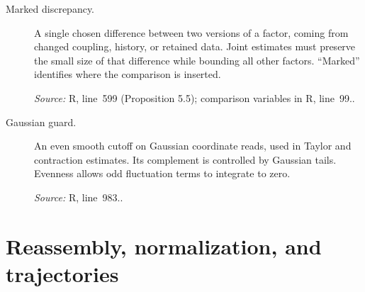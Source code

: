 \documentclass[11pt]{article}
\newcommand{\src}[2]{\textsf{#1}, line~#2}
\newcommand{\where}[1]{\par{\small\textit{Source:} #1.}}
\begin{document}
\begin{description}
\item[Marked discrepancy.]
A single chosen difference between two versions of a factor, coming
from changed coupling, history, or retained data.  Joint estimates
must preserve the small size of that difference while bounding all
other factors.  ``Marked'' identifies where the comparison is inserted.
\where{\src{R}{599} (Proposition 5.5); comparison variables in \src{R}{99}.}

\item[Gaussian guard.]
An even smooth cutoff on Gaussian coordinate reads, used in Taylor
and contraction estimates.  Its complement is controlled by Gaussian
tails.  Evenness allows odd fluctuation terms to integrate to zero.
\where{\src{R}{983}.}
\end{description}

\section*{Reassembly, normalization, and trajectories}
\end{document}
